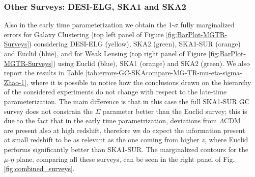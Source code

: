 \subsubsection{Other Surveys: DESI-ELG, SKA1 and SKA2 \label{subsub: other-surveys-early-time}}

Also in the early time parameterization we obtain
the 1-$\sigma$ fully marginalized errors for Galaxy Clustering (top left
panel of Figure \ref{fig:BarPlot-MGTR-Surveys}) considering DESI-ELG
(yellow), SKA2 (green), SKA1-SUR (orange) and Euclid (blue), and for
Weak Lensing (top right panel of Figure \ref{fig:BarPlot-MGTR-Surveys})
using Euclid (blue), SKA1 (orange) and SKA2 (green). We also report
the results in Table \ref{tab:errors-GC-SKAcompare-MG-TR-mu-eta-sigma-Zhao-1},
where it is possible to notice how the conclusions drawn on the hierarchy
 of the considered experiments do not change
with respect to the late-time parameterization. The main difference
is that in this case the full SKA1-SUR GC survey does not
constrain the $\Sigma$ parameter better than the Euclid survey; this
is due to the fact that in the early time parametrization, deviations
from $\Lambda$CDM are present also at high redshift, therefore we
do expect the information present at small redshift to be as relevant
as the one coming from higher $z$, where Euclid performs significantly
better than SKA1-SUR. The marginalized contours for the $\mu$-$\eta$ plane, 
comparing all these surveys, can be seen in the right panel of Fig.\ref{fig:combined_surveys}.



